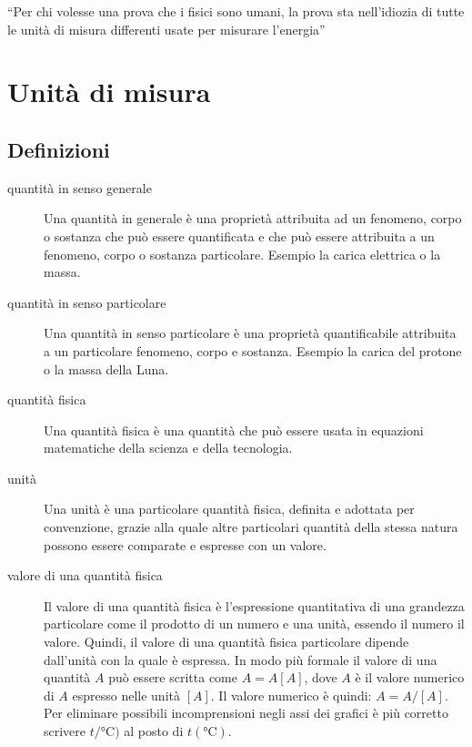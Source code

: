 \begin{savequote}[6cm]
  ``Per chi volesse una prova che i fisici sono umani, la prova sta nell'idiozia di tutte le unità di misura differenti usate per misurare l'energia''
\end{savequote}
\chapter{Unità di misura\label{unita_di_misura_appendice}}
\section{Definizioni}
\begin{description}
  \item[quantità in senso generale] Una quantità in generale è una proprietà attribuita ad un fenomeno, corpo o sostanza che può essere quantificata e che può essere attribuita a un fenomeno, corpo o sostanza particolare. Esempio la carica elettrica o la massa.
  \item[quantità in senso particolare] Una quantità in senso particolare è una proprietà quantificabile attribuita a un particolare fenomeno, corpo e sostanza. Esempio la carica del protone o la massa della Luna.
  \item[quantità fisica] Una quantità fisica è una quantità che può essere usata in equazioni matematiche della scienza e della tecnologia.
  \item[unità] Una unità è una particolare quantità fisica, definita e adottata per convenzione, grazie alla quale altre particolari quantità della stessa natura possono essere comparate e espresse con un valore.
  \item[valore di una quantità fisica] Il valore di una quantità fisica è l'espressione quantitativa di una grandezza particolare come il prodotto di un numero e una unità, essendo il numero il valore. Quindi, il valore di una quantità fisica particolare dipende dall'unità con la quale è espressa. In modo più formale il valore di una quantità $A$ può essere scritta come $A={A}[A]$, dove ${A}$ è il valore numerico di $A$ espresso nelle unità $[A]$. Il valore numerico è quindi: ${A}=A/[A]$. Per eliminare possibili incomprensioni negli assi dei grafici è più corretto scrivere $t/\si{\celsius})$ al posto di $t(\si{\celsius})$.
\end{description}
